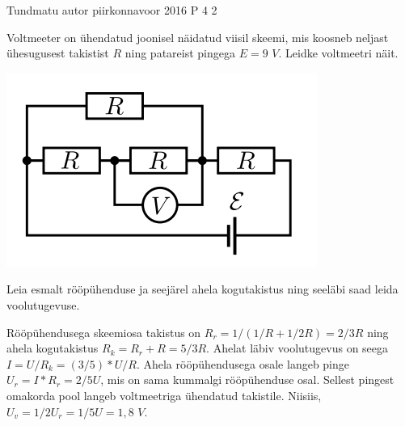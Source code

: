 {Tundmatu autor} %
{piirkonnavoor} %
{2016} %
{P 4} %
{2} %
{

\ifStatement
Voltmeeter on ühendatud joonisel näidatud viisil skeemi, mis koosneb neljast ühesugusest takistist $R$ ning patareist pingega $E = 9$ $V$. Leidke voltmeetri näit.
\begin{center}
	\includegraphics[width=0.5\linewidth]{2016-v2p-04-yl.png}
\end{center}
\fi



\ifHint
Leia esmalt rööpühenduse ja seejärel ahela kogutakistus ning seeläbi saad leida voolutugevuse.
\fi

\ifSolution
Rööpühendusega skeemiosa takistus on $R_r = 1/(1/R + 1/2R) = 2/3 R$ ning ahela kogutakistus $R_k = R_r + R = 5/3R$. Ahelat läbiv voolutugevus on seega $I = U/R_k = (3/5)*U/R$. Ahela rööpühendusega osale langeb pinge $U_r = I*R_r = 2/5 U$, mis on sama kummalgi rööpühenduse osal. Sellest pingest omakorda pool langeb voltmeetriga ühendatud takistile. Niisiis, $U_v = 1/2U_r = 1/5 U = 1,8$ $V$.
\fi
}
